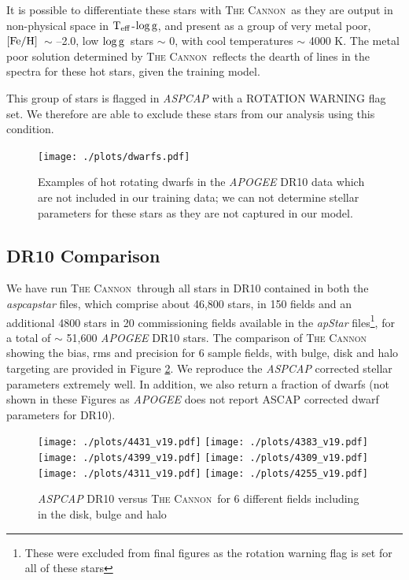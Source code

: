 \documentclass[12pt, preprint]{aastex}
\newcommand{\teff}{\mbox{$\rm T_{eff}$}}
\newcommand{\feh}{\mbox{$\rm [Fe/H]$}}
\newcommand{\logg}{\mbox{$\rm \log g$}}
\newcommand{\tc}{\textsc{The Cannon}}
\begin{document}
It is possible to differentiate these stars with \tc\, as they are output in non-physical space in \teff-\logg, and present as a group of very metal poor, \feh\ $\sim$ --2.0, low \logg\ stars $\sim$ 0, with cool temperatures $\sim$ 4000 K. The metal poor solution determined by \tc\ reflects the dearth of lines in the spectra for these hot stars, given the training model. 

This group of stars is flagged in \textit{ASPCAP} with a ROTATION WARNING flag set. We therefore are able to exclude these stars from our analysis using this condition. 
 
 \begin{figure}[h]
 \texttt{[image: ./plots/dwarfs.pdf]}
  \caption{Examples of hot rotating dwarfs in the \textit{APOGEE} DR10 data which are not included in our training data; we can not determine stellar parameters for these stars as they are not captured in our model.}
\label{fig:dwarfs}
\end{figure}

\subsection{DR10 Comparison}
 
We have run \tc\ through all stars in DR10 contained in both the \textit{aspcapstar} files,  which comprise about 46,800 stars, in 150 fields and an additional 4800 stars in 20 commissioning fields available in the \textit{apStar} files\footnote{These were excluded from final figures as the rotation warning flag is set for all of these stars}, for a total of $\sim$ 51,600 \textit{APOGEE} DR10 stars. The comparison of \tc\, showing the bias, rms and precision for 6 sample fields, with bulge, disk and halo targeting are provided in Figure \ref{fig:cal}. We reproduce the \textit{ASPCAP} corrected stellar parameters extremely well. In addition, we also return a fraction of dwarfs (not shown in these Figures as \textit{APOGEE} does not report ASCAP corrected dwarf parameters for DR10). 

\begin{figure}[h!]
\centering
  \texttt{[image: ./plots/4431\_v19.pdf]}
    \texttt{[image: ./plots/4383\_v19.pdf]} \\
      \texttt{[image: ./plots/4399\_v19.pdf]}
        \texttt{[image: ./plots/4309\_v19.pdf]} \\
              \texttt{[image: ./plots/4311\_v19.pdf]}
        \texttt{[image: ./plots/4255\_v19.pdf]} \\
\caption{\small{\textit{ASPCAP} DR10 versus \tc\ for 6 different fields including in the disk, bulge and halo}}
\label{fig:cal}
\end{figure}
\end{document}
